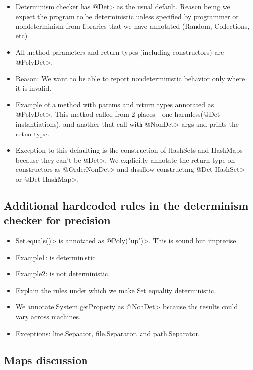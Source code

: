 \begin{itemize}
    \item Determinism checker has \<@Det> as the usual default. Reason being we expect the program to be 
    deterministic unless specified by programmer or nondeterminism from libraries that we have annotated (Random, Collections, etc).
    \item All method parameters and return types (including constructors) are \<@PolyDet>.
    \item Reason: We want to be able to report nondeterministic behavior only where it is invalid.
    \item Example of a method with params and return types annotated as \<@PolyDet>.
    This method called from 2 places - one harmless(@Det instantiations), and another that call with \<@NonDet> args and prints the retun type.
    \item Exception to this defaulting is the construction of HashSets and HashMaps because they can't be \<@Det>.
    We explicitly annotate the return type on constructors as
        \<@OrderNonDet> and disallow constructing \<@Det HashSet> or \<@Det
        HashMap>.
\end{itemize}

\subsection{Additional hardcoded rules in the determinism checker  for precision}

\begin{itemize}
    \item \<Set.equals()> is annotated as \<@Poly("up")>. This is sound but imprecise.
    \item Example1:  is deterministic
    \item Example2:  is not deterministic.
    \item Explain the rules under which we make Set equality deterministic.
    \item We annotate System.getProperty as \<@NonDet> because the results could vary across machines.
    \item Exceptions: line.Sepaator, file.Separator. and path.Separator.
\end{itemize}

\subsection{Maps discussion}

